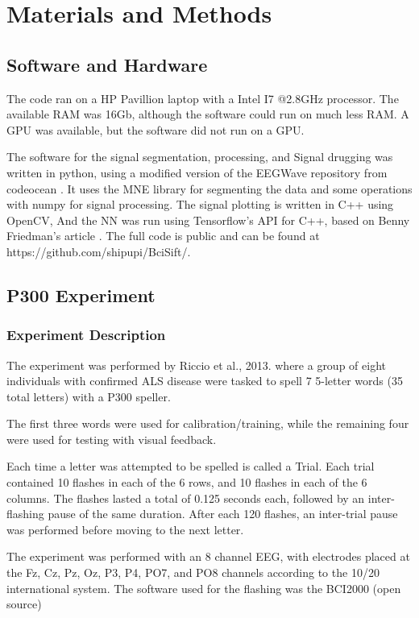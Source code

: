 \documentclass[conference]{IEEEtran}
\begin{document}
\section{Materials and Methods}


\subsection{Software and Hardware}
The code ran on a HP Pavillion laptop with a Intel I7 @2.8GHz processor. The available RAM was 16Gb, although the software could run on much less RAM. A GPU was available, but the software did not run on a GPU.

The software for the signal segmentation, processing, and Signal drugging was written in python, using a modified version of the EEGWave repository from codeocean \cite{Ramele2018EEGWA}. It uses the MNE library for segmenting the data and some operations with numpy for signal processing.
The signal plotting is written in C++ using OpenCV, And the NN was run using Tensorflow's API for C++, based on Benny Friedman's article \cite{BennyCNN}. The full code is public and can be found at https://github.com/shipupi/BciSift/.


\subsection{P300 Experiment}
\subsubsection{Experiment Description}
The experiment was performed by Riccio et al., 2013\cite{riccio2013}. where a group of eight individuals with confirmed ALS disease were tasked to spell 7 5-letter words (35 total letters) with a P300 speller.

The first three words were used for calibration/training, while the remaining four were used for testing with visual feedback.

Each time a letter was attempted to be spelled is called a Trial. Each trial contained 10 flashes in each of the 6 rows, and 10 flashes in each of the 6 columns. The flashes lasted a total of 0.125 seconds each, followed by an inter-flashing pause of the same duration. After each 120 flashes, an inter-trial pause was performed before moving to the next letter.

The experiment was performed with an 8 channel EEG, with electrodes placed at the Fz, Cz, Pz, Oz, P3, P4, PO7, and PO8 channels according to the 10/20 international system. The software used for the flashing was the BCI2000 (open source) \cite{schalk2004}
\end{document}
